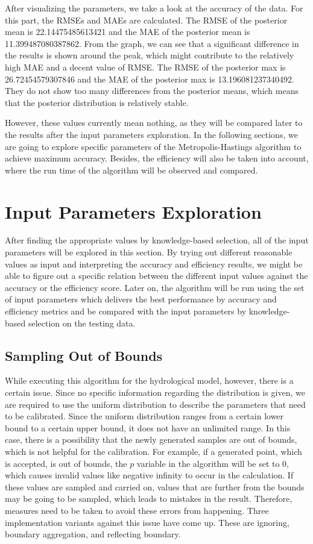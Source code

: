 After visualizing the parameters, we take a look at the accuracy of the data. For this part, the RMSEs and MAEs are calculated. The RMSE of the posterior mean is 22.14475485613421 and the MAE of the posterior mean is 11.399487080387862. From the graph, we can see that a significant difference in the results is shown around the peak, which might contribute to the relatively high MAE and a decent value of RMSE. The RMSE of the posterior max is 26.72454579307846 and the MAE of the posterior max is 13.196081237340492. They do not show too many differences from the posterior means, which means that the posterior distribution is relatively stable. 

However, these values currently mean nothing, as they will be compared later to the results after the input parameters exploration. In the following sections, we are going to explore specific parameters of the Metropolis-Hastings algorithm to achieve maximum accuracy. Besides, the efficiency will also be taken into account, where the run time of the algorithm will be observed and compared.


\section{Input Parameters Exploration}
After finding the appropriate values by knowledge-based selection, all of the input parameters will be explored in this section. By trying out different reasonable values as input and interpreting the accuracy and efficiency results, we might be able to figure out a specific relation between the different input values against the accuracy or the efficiency score. Later on, the algorithm will be run using the set of input parameters which delivers the best performance by accuracy and efficiency metrics and be compared with the input parameters by knowledge-based selection on the testing data.

\subsection{Sampling Out of Bounds}
While executing this algorithm for the hydrological model, however, there is a certain issue. Since no specific information regarding the distribution is given, we are required to use the uniform distribution to describe the parameters that need to be calibrated. Since the uniform distribution ranges from a certain lower bound to a certain upper bound, it does not have an unlimited range. In this case, there is a possibility that the newly generated samples are out of bounds, which is not helpful for the calibration. For example, if a generated point, which is accepted, is out of bounds, the $p$ variable in the algorithm will be set to 0, which causes invalid values like negative infinity to occur in the calculation. If these values are sampled and carried on, values that are further from the bounds may be going to be sampled, which leads to mistakes in the result. Therefore, measures need to be taken to avoid these errors from happening. Three implementation variants against this issue have come up. These are ignoring, boundary aggregation, and reflecting boundary.

